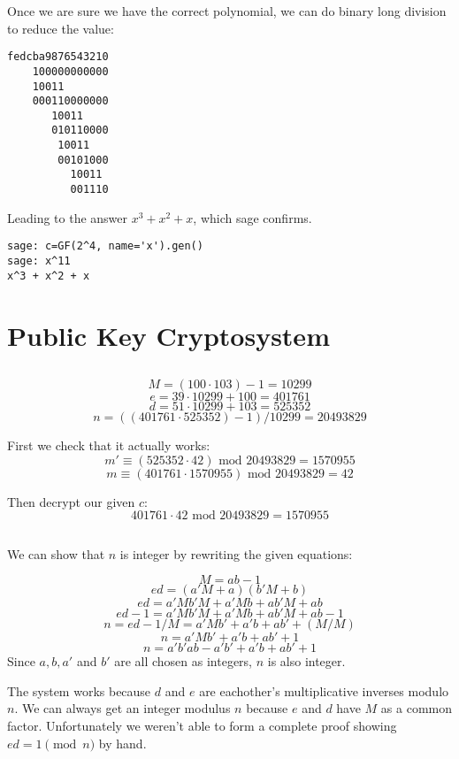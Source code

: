 \documentclass{article}
\begin{document}
Once we are sure we have the correct polynomial, we can do binary long division to reduce the value:

\begin{verbatim}
fedcba9876543210
    100000000000
    10011
    000110000000
       10011
       010110000
        10011
        00101000
          10011
          001110
\end{verbatim}

Leading to the answer $x^3 + x^2 + x$, which sage confirms.

\begin{verbatim}
sage: c=GF(2^4, name='x').gen()
sage: x^11
x^3 + x^2 + x
\end{verbatim}

\section{Public Key Cryptosystem}

\subsection{}
\[M = (100 \cdot 103)-1=10299 \]
\[e = 39 \cdot 10299 + 100 = 401761\]
\[d = 51 \cdot 10299 + 103 = 525352\]
\[n = ((401761 \cdot 525352)-1)/10299 = 20493829\]

First we check that it actually works:
\[m'\equiv (525352 \cdot 42) \mbox{ mod 20493829} = 1570955\]
\[m\equiv (401761 \cdot 1570955) \mbox{ mod 20493829} = 42\]

Then decrypt our given $c$:
\[ 401761 \cdot 42 \mbox{ mod 20493829} = 1570955 \]


\subsection{}
We can show that $n$ is integer by rewriting the given equations:

\[M=ab-1 \]
\[ed=(a'M+a)(b'M+b)\]
\[ed=a'Mb'M + a'Mb + ab'M + ab \]
\[ed-1=a'Mb'M + a'Mb + ab'M + ab-1 \]
\[n=ed-1/M=a'Mb' + a'b  + ab' + (M/M) \]
\[n=a'Mb' + a'b  + ab' + 1 \]
\[n=a'b'ab - a'b' + a'b  + ab' + 1 \]
Since $a, b, a'$ and $b'$ are all chosen as integers, $n$ is also integer.

The system works because $d$ and $e$ are eachother's multiplicative inverses modulo $n$.
We can always get an integer modulus $n$ because $e$ and $d$ have $M$ as a common factor.
Unfortunately we weren't able to form a complete proof showing $ed = 1 \pmod n$ by hand.
\end{document}
